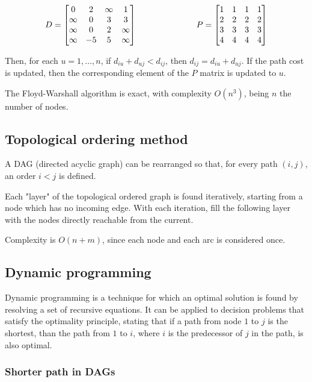 $$
D=
\begin{bmatrix}
    0 & 2 & \infty & 1 \\
    \infty & 0 & 3 & 3 \\
    \infty & 0 & 2 & \infty \\
    \infty & -5 & 5 & \infty
\end{bmatrix}
\hspace{2.5cm}
P=
\begin{bmatrix}
    1 & 1 & 1 & 1 \\
    2 & 2 & 2 & 2 \\
    3 & 3 & 3 & 3 \\
    4 & 4 & 4 & 4
\end{bmatrix}
$$

Then, for each $u = 1, \dots, n$, if $d_{iu} + d_{uj} < d_{ij}$, then $d_{ij} = d_{iu} + d_{uj}$.
If the path cost is updated, then the corresponding element of the $P$ matrix is updated to $u$.

The Floyd-Warshall algorithm is exact, with complexity $O(n^3)$, being $n$ the number of nodes.

\subsection{Topological ordering method}

A DAG (directed acyclic graph) can be rearranged so that, for every path $(i, j)$, an order $i < j$ is defined.

Each "layer" of the topological ordered graph is found iteratively, starting from a node which has no incoming edge.
With each iteration, fill the following layer with the nodes directly reachable from the current.

Complexity is $O(n+m)$, since each node and each arc is considered once.

\subsection{Dynamic programming}

Dynamic programming is a technique for which an optimal solution is found by resolving a set of recursive equations.
It can be applied to decision problems that satisfy the optimality principle, stating that if a path from node $1$ to $j$ is the shortest, than the path from $1$ to $i$, where $i$ is the predecessor of $j$ in the path, is also optimal.

\subsubsection{Shorter path in DAGs}

